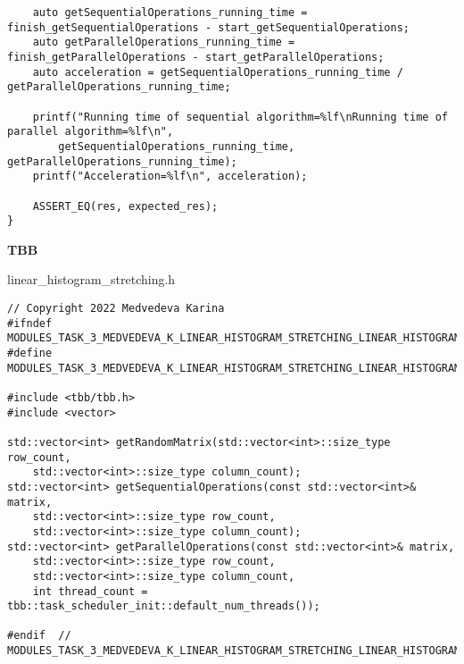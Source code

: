 \documentclass{report}
\begin{document}
\begin{lstlisting}
    auto getSequentialOperations_running_time = finish_getSequentialOperations - start_getSequentialOperations;
    auto getParallelOperations_running_time = finish_getParallelOperations - start_getParallelOperations;
    auto acceleration = getSequentialOperations_running_time / getParallelOperations_running_time;

    printf("Running time of sequential algorithm=%lf\nRunning time of parallel algorithm=%lf\n",
        getSequentialOperations_running_time, getParallelOperations_running_time);
    printf("Acceleration=%lf\n", acceleration);

    ASSERT_EQ(res, expected_res);
}
\end{lstlisting}

\textbf{TBB}
\par linear\_histogram\_stretching.h
\begin{lstlisting}
// Copyright 2022 Medvedeva Karina
#ifndef MODULES_TASK_3_MEDVEDEVA_K_LINEAR_HISTOGRAM_STRETCHING_LINEAR_HISTOGRAM_STRETCHING_H_
#define MODULES_TASK_3_MEDVEDEVA_K_LINEAR_HISTOGRAM_STRETCHING_LINEAR_HISTOGRAM_STRETCHING_H_

#include <tbb/tbb.h>
#include <vector>

std::vector<int> getRandomMatrix(std::vector<int>::size_type row_count,
    std::vector<int>::size_type column_count);
std::vector<int> getSequentialOperations(const std::vector<int>& matrix,
    std::vector<int>::size_type row_count,
    std::vector<int>::size_type column_count);
std::vector<int> getParallelOperations(const std::vector<int>& matrix,
    std::vector<int>::size_type row_count,
    std::vector<int>::size_type column_count,
    int thread_count = tbb::task_scheduler_init::default_num_threads());

#endif  // MODULES_TASK_3_MEDVEDEVA_K_LINEAR_HISTOGRAM_STRETCHING_LINEAR_HISTOGRAM_STRETCHING_H_
\end{lstlisting}
\end{document}

